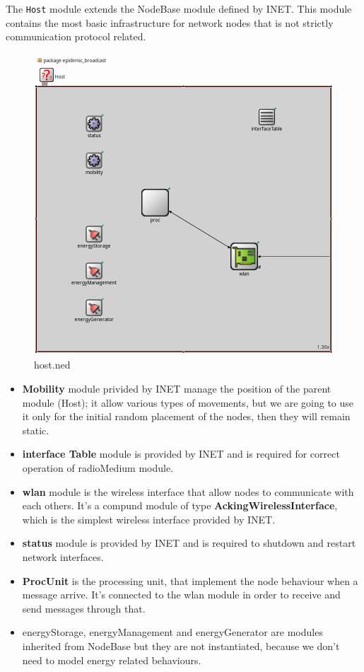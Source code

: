 The \texttt{Host} module extends the NodeBase module defined by INET. This
module contains the most basic infrastructure for network nodes that is not
strictly communication protocol related.
\begin{figure}[H]
    \begin{center}
        \includegraphics[scale=0.35]{img/host.png}
        \caption{host.ned}
        \label{fig:single_queue}
    \end{center}
    \vspace*{-0.8cm}
\end{figure}
\begin{itemize}
    \item \textbf{Mobility} module privided by INET manage the position of the parent module (Host); it allow various types of movements,
        but we are going to use it only for the initial random placement of the nodes, then they will remain static.
    \item \textbf{interface Table} module is provided by INET and is required for correct operation of radioMedium module.
    \item \textbf{wlan} module is the wireless interface that allow nodes to communicate with each others. It's a compund module of type 
        \textbf{AckingWirelessInterface}, which is the simplest wireless interface provided by INET.
    \item \textbf{status} module is provided by INET and is required to shutdown and restart network interfaces.
    \item \textbf{ProcUnit} is the processing unit, that implement the node behaviour when a message arrive. It's connected to
    the wlan module in order to receive and send messages through that.
    \item energyStorage, energyManagement and energyGenerator are modules inherited from NodeBase but they are not instantiated,
        because we don't need to model energy related behaviours.
\end{itemize}
